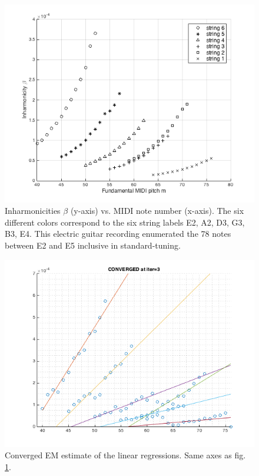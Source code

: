 \documentclass[12pt]{cmuthesis}
\begin{document}
\begin{figure}[h]
\centering
\includegraphics[scale=.6]{beta-v-midi.png}
\caption{Inharmonicities $\beta$ (y-axis) vs. MIDI note number (x-axis). The six different colors correspond to the six string labels E2, A2, D3, G3, B3, E4. This electric guitar recording enumerated the 78 notes between E2 and E5 inclusive in standard-tuning.}
\label{fig:beta}
\end{figure}

\begin{figure}[h]
\centering
\includegraphics[scale=0.6]{em.png}
\caption{Converged EM estimate of the linear regressions. Same axes as fig. \ref{fig:beta}.}
\label{fig:em}
\end{figure}
\end{document}
